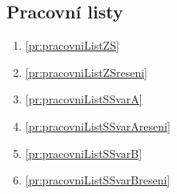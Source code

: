 \subsection*{Pracovní listy}
\begin{enumerate}[align=left, labelwidth=0cm, label={Příloha č. -- }\arabic*, resume]
    \item \ref{pr:pracovniListZS}
    \item \ref{pr:pracovniListZSreseni}
    \item \ref{pr:pracovniListSSvarA}
    \item \ref{pr:pracovniListSSvarAreseni}
    \item \ref{pr:pracovniListSSvarB}
    \item \ref{pr:pracovniListSSvarBreseni}
\end{enumerate}